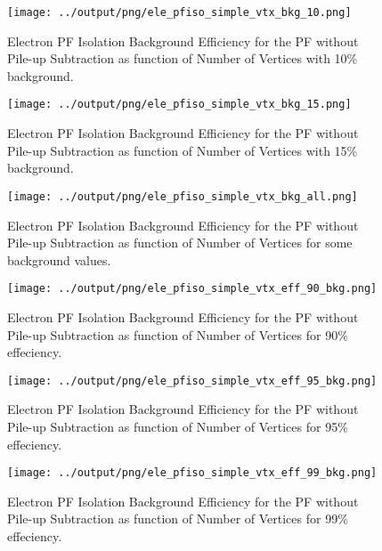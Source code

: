 \documentclass[11pt]{book}
\begin{document}
\begin{figure}[htb]
\centering
\texttt{[image: ../output/png/ele\_pfiso\_simple\_vtx\_bkg\_10.png]}
\caption{Electron PF Isolation Background Efficiency for the PF without Pile-up Subtraction as function of Number of Vertices with 10\% background.}
\label{fig:ele_pfiso_vtx_bkg_simple_bkg_10}
\end{figure}

\begin{figure}[htb]
\centering
\texttt{[image: ../output/png/ele\_pfiso\_simple\_vtx\_bkg\_15.png]}
\caption{Electron PF Isolation Background Efficiency for the PF without Pile-up Subtraction as function of Number of Vertices with 15\% background.}
\label{fig:ele_pfiso_vtx_bkg_simple_bkg_15}
\end{figure}

\begin{figure}[htb]
\centering
\texttt{[image: ../output/png/ele\_pfiso\_simple\_vtx\_bkg\_all.png]}
\caption{Electron PF Isolation Background Efficiency for the PF without Pile-up Subtraction as function of Number of Vertices for some background values.}
\label{fig:ele_pfiso_vtx_bkg_simple_bkg_all}
\end{figure}

\begin{figure}[htb]
\centering
\texttt{[image: ../output/png/ele\_pfiso\_simple\_vtx\_eff\_90\_bkg.png]}
\caption{Electron PF Isolation Background Efficiency for the PF without Pile-up Subtraction as function of Number of Vertices for 90\% effeciency.}
\label{fig:ele_pfiso_vtx_eff_simple_eff_90_bkg}
\end{figure}

\begin{figure}[htb]
\centering
\texttt{[image: ../output/png/ele\_pfiso\_simple\_vtx\_eff\_95\_bkg.png]}
\caption{Electron PF Isolation Background Efficiency for the PF without Pile-up Subtraction as function of Number of Vertices for 95\% effeciency.}
\label{fig:ele_pfiso_vtx_eff_simple_eff_95_bkg}
\end{figure}

\begin{figure}[htb]
\centering
\texttt{[image: ../output/png/ele\_pfiso\_simple\_vtx\_eff\_99\_bkg.png]}
\caption{Electron PF Isolation Background Efficiency for the PF without Pile-up Subtraction as function of Number of Vertices for 99\% effeciency.}
\label{fig:ele_pfiso_vtx_eff_simple_eff_99_bkg}
\end{figure}
\end{document}
